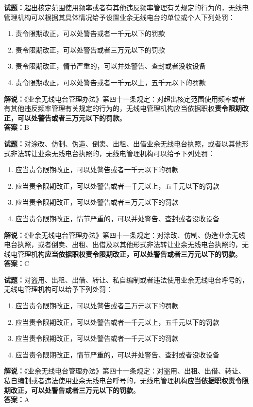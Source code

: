 \documentclass{ctexbook}
\begin{document}
\noindent\textbf{试题：}超出核定范围使用频率或者有其他违反频率管理有关规定的行为的，无线电管理机构可以根据其具体情况给予设置业余无线电台的单位或个人下列处罚：
\begin{enumerate}[leftmargin=3em]
	\item 责令限期改正，可以处警告或者一千元以下的罚款
	\item 责令限期改正，可以处警告或者三万元以下的罚款
	\item 责令限期改正，情节严重的，可以并处警告、查封或者没收设备
	\item 责令限期改正，可以处警告或者一千元以上，五千元以下的罚款
\end{enumerate}
\noindent\textbf{解说：}《业余无线电台管理办法》第四十一条规定：对超出核定范围使用频率或者有其他违反频率管理有关规定的行为的，无线电管理机构应当依据职权\textbf{责令限期改正，可以处警告或者三万元以下的罚款}。\\\textbf{答案：}B


\bigskip


\noindent\textbf{试题：}对涂改、仿制、伪造、倒卖、出租、出借业余无线电台执照，或者以其他形式非法转让业余无线电台执照的，无线电管理机构可以给予下列处罚：
\begin{enumerate}[leftmargin=3em] 
	\item 应当责令限期改正，可以处警告或者一千元以下的罚款
	\item 应当责令限期改正，可以处警告或者一千元以上，五千元以下的罚款
	\item 应当责令限期改正，可以处警告或者三万元以下的罚款
	\item 应当责令限期改正，情节严重的，可以并处警告、查封或者没收设备
\end{enumerate}
\noindent\textbf{解说：}《业余无线电台管理办法》第四十一条规定：对涂改、仿制、伪造业余无线电台执照，或者倒卖、出租、出借及以其他形式非法转让业余无线电台执照的，无线电管理机构\textbf{应当依据职权责令限期改正，可以处警告或者三万元以下的罚款}。\\\textbf{答案：}C

\bigskip


\noindent\textbf{试题：}对盗用、出租、出借、转让、私自编制或者违法使用业余无线电台呼号的，无线电管理机构可以给予下列处罚：
\begin{enumerate}[leftmargin=3em]
	\item 应当责令限期改正，可以处警告或者三万元以下的罚款
	\item 应当责令限期改正，可以处警告或者一千元以上，五千元以下的罚款
	\item 应当责令限期改正，可以处警告或者一千元以下的罚款
	\item 应当责令限期改正，情节严重的，可以并处警告、查封或者没收设备
\end{enumerate}
\noindent\textbf{解说：}《业余无线电台管理办法》第四十一条规定：对盗用、出租、出借、转让、私自编制或者违法使用业余无线电台呼号的，无线电管理机构\textbf{应当依据职权责令限期改正，可以处警告或者三万元以下的罚款}。\\\textbf{答案：}A
\end{document}
